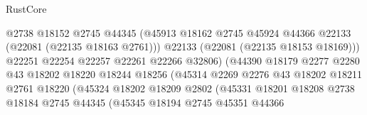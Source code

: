 \begin{lexlean}{RustCore}
\begin{coremodule}
                                          @2738
                                          @18152
                                          @2745
                                          @44345
                                          (@45913
                                            @18162
                                            @2745
                                            @45924
                                            @44366
                                            @22133
                                            (@22081 (@22135 @18163 @2761)))
                                          @22133
                                          (@22081 (@22135 @18153 @18169)))
                                        @22251
                                        @22254
                                        @22257
                                        @22261
                                        @22266
                                        @32806)
                                      (@44390
                                        @18179
                                        @2277
                                        @2280
                                        @43
                                        @18202
                                        @18220
                                        @18244
                                        @18256
                                        (@45314
                                          @2269
                                          @2276
                                          @43
                                          @18202
                                          @18211
                                          @2761
                                          @18220
                                          (@45324
                                            @18202
                                            @18209
                                            @2802
                                            (@45331
                                              @18201
                                              @18208
                                              @2738
                                              @18184
                                              @2745
                                              @44345
                                              (@45345
                                                @18194
                                                @2745
                                                @45351
                                                @44366

\end{coremodule}
\end{lexlean}
